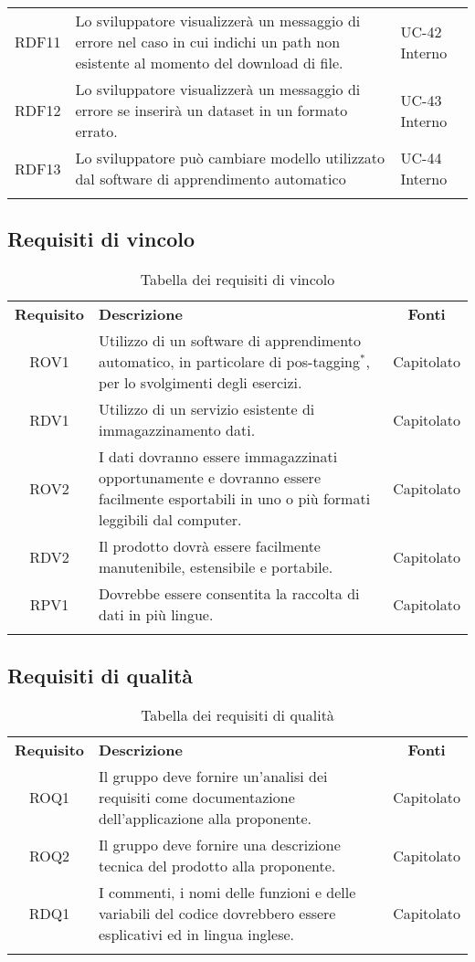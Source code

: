 \begin{tabularx}{\textwidth}{| c | p{10cm} | X |}
		RDF11 & Lo sviluppatore visualizzerà un messaggio di errore nel caso in cui indichi un path non esistente al momento del download di file. & UC-42 \newline Interno\\
		RDF12 & Lo sviluppatore visualizzerà un messaggio di errore se inserirà un dataset in un formato errato. & UC-43 \newline Interno\\
		RDF13 & Lo sviluppatore può cambiare modello utilizzato dal software di apprendimento automatico & UC-44 \newline Interno\\
		\hline
		\caption{Tabella dei requisiti funzionali}
\end{tabularx}

\subsection{Requisiti di vincolo}
\begin{longtable}{| c | p{10cm} | c |}
		\rowcolor{LightBlue}
		\color{white}\bfseries Requisito & \color{white}\bfseries Descrizione & \color{white}\bfseries Fonti\\[0.25cm]
		ROV1 & Utilizzo di un software di apprendimento automatico, in particolare di pos-tagging$^*$, per lo svolgimenti degli esercizi. & Capitolato \\
		RDV1 & Utilizzo di un servizio esistente di immagazzinamento dati. & Capitolato \\
		ROV2 & I dati dovranno essere immagazzinati opportunamente e dovranno essere facilmente esportabili in uno o più formati leggibili dal computer. & Capitolato \\
		RDV2 & Il prodotto dovrà essere facilmente manutenibile, estensibile e portabile. & Capitolato \\
		RPV1 & Dovrebbe essere consentita la raccolta di dati in più lingue. & Capitolato \\ \hline
		\caption{Tabella dei requisiti di vincolo}
\end{longtable}

\subsection{Requisiti di qualità}
\begin{longtable}{| c | p{10cm} | c |}
		\rowcolor{LightBlue}
		\color{white}\bfseries Requisito & \color{white}\bfseries Descrizione & \color{white}\bfseries Fonti\\[0.25cm]
		ROQ1 & Il gruppo deve fornire un'analisi dei requisiti come documentazione dell'applicazione alla proponente. & Capitolato \\
		ROQ2 & Il gruppo deve fornire una descrizione tecnica del prodotto alla proponente. & Capitolato \\ 
		RDQ1 & I commenti, i nomi delle funzioni e delle variabili del codice dovrebbero essere esplicativi ed in lingua inglese. & Capitolato \\ \hline
		\caption{Tabella dei requisiti di qualità}
\end{longtable}
